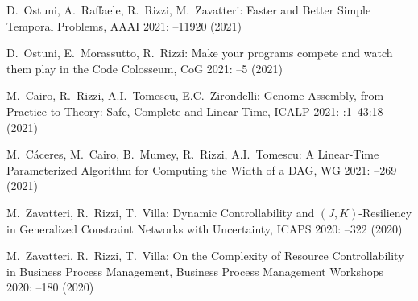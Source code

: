 \begin{etaremune}
\item {\sc D.~Ostuni, A.~Raffaele, R.~Rizzi, M.~Zavatteri:}
   \newblock Faster and Better Simple Temporal Problems,
   \newblock AAAI 2021:
   --11920 (2021)
   
\item {\sc D.~Ostuni, E.~Morassutto, R.~Rizzi:}
   \newblock Make your programs compete and watch them play in the Code Colosseum,
   \newblock CoG 2021:
   --5 (2021)
   
\item {\sc M.~Cairo, R.~Rizzi, A.I.~Tomescu, E.C.~Zirondelli:}
   \newblock Genome Assembly, from Practice to Theory: Safe, Complete and Linear-Time,
   \newblock ICALP 2021:
   :1--43:18 (2021)
   
\item {\sc M.~Cáceres, M.~Cairo, B.~Mumey, R.~Rizzi, A.I.~Tomescu:}
   \newblock A Linear-Time Parameterized Algorithm for Computing the Width of a DAG,
   \newblock WG 2021:
   --269 (2021)
   
\item {\sc M.~Zavatteri, R.~Rizzi, T.~Villa:}
   \newblock Dynamic Controllability and $(J,K)$-Resiliency in Generalized Constraint Networks with Uncertainty,
   \newblock  ICAPS 2020:
   --322 (2020)
   
\item {\sc M.~Zavatteri, R.~Rizzi, T.~Villa:}
   \newblock On the Complexity of Resource Controllability in Business Process Management,
   \newblock  Business Process Management Workshops 2020:
   --180 (2020)
   

\end{etaremune}
